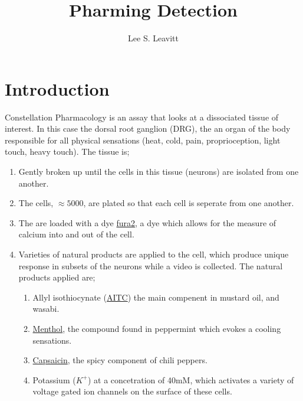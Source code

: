 \documentclass[11pt, fullpage,letterpaper]{article}
\title{Pharming Detection \semester}
\author{Lee S. Leavitt}
\begin{document}
\maketitle
\newcommand{\Hcal}{\mathcal{H}} 

\section{Introduction}
Constellation Pharmacology is an assay that looks at a dissociated tissue of interest. In this case the dorsal root ganglion (DRG), the an organ of the body responsible for all physical sensations (heat, cold, pain, proprioception, light touch, heavy touch). The tissue is;
\begin{enumerate}	
\item Gently broken up until the cells in this tissue (neurons) are isolated from one another. 
\item The cells, $\approx 5000$, are plated so that each cell is seperate from one another.
\item The are loaded with a dye \href{https://www.ncbi.nlm.nih.gov/pmc/articles/PMC2763293/}{fura2}, a dye which allows for the measure of calcium into and out of the cell.
\item Varieties of natural products are applied to the cell, which produce unique response in subsets of the neurons while a video is collected. The natural products applied are;
	\begin{enumerate}
		\item Allyl isothiocynate (\href{https://en.wikipedia.org/wiki/Allyl_isothiocyanate}{AITC}) the main compenent in mustard oil, and wasabi.
		\item \href{https://en.wikipedia.org/wiki/Menthol}{Menthol}, the compound found in peppermint which evokes a cooling sensations. 
		\item \href{https://en.wikipedia.org/wiki/Capsaicin}{Capsaicin}, the spicy component of chili peppers. 
		\item Potassium ($K^+$) at a concetration of 40mM, which activates a variety of voltage gated ion channels on the surface of these cells.
		\begin{center}

\end{center}
\end{enumerate}
\end{enumerate}
\end{document}
